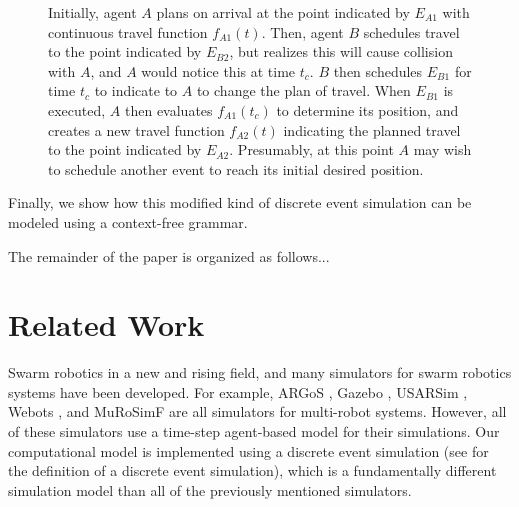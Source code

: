 \documentclass[conference,letterpaper]{IEEEtran}
\begin{document}
\begin{figure}[ht]

    \begin{center}
    \end{center}

    \caption{Initially, agent $A$ plans on arrival at the point indicated by
    $E_{A1}$ with continuous travel function $f_{A1}(t)$. Then, agent $B$
    schedules travel to the point indicated by $E_{B2}$, but realizes this will
    cause collision with $A$, and $A$ would notice this at time $t_c$. $B$ then
    schedules $E_{B1}$ for time $t_c$ to indicate to $A$ to change the plan of
    travel. When $E_{B1}$ is executed, $A$ then evaluates $f_{A1}(t_c)$ to
    determine its position, and creates a new travel function $f_{A2}(t)$
    indicating the planned travel to the point indicated by $E_{A2}$.
    Presumably, at this point $A$ may wish to schedule another event to reach
    its initial desired position.}
    \label{fig:introagentfunctions}

\end{figure}

Finally, we show how this modified kind of discrete event simulation can be
modeled using a context-free grammar.

The remainder of the paper is organized as follows...

\section{Related Work}

Swarm robotics in a new and rising field, and many simulators for swarm
robotics systems have been developed. For example, ARGoS \cite{argos}, Gazebo
\cite{gazebo}, USARSim \cite{usarsim}, Webots \cite{webots}, and MuRoSimF
\cite{murosimf} are all simulators for multi-robot systems. However, all of
these simulators use a time-step agent-based model for their simulations. Our
computational model is implemented using a discrete event simulation (see
\cite[p.~3]{leemispark} for the definition of a discrete event simulation),
which is a fundamentally different simulation model than all of the previously
mentioned simulators.
\end{document}
